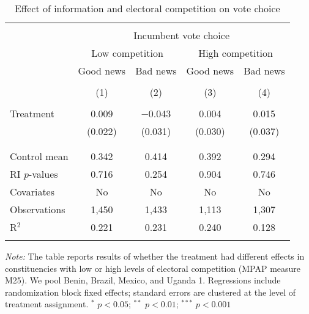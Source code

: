 
\begin{table}[!htbp] \centering 
  \caption{Effect of information and electoral competition on vote choice} 
  \label{competition} 
\begin{tabular}{@{\extracolsep{1pt}}lcccc} 
\\[-1.8ex]\hline 
\hline \\[-1.8ex] 
 & \multicolumn{4}{c}{Incumbent vote choice} \\ 
\cline{2-5} 
& \multicolumn{2}{c}{Low competition} &\multicolumn{2}{c}{High competition} \\
\cline{2-5}
 & Good news & Bad news & Good news & Bad news \\ 
\\[-1.8ex] & (1) & (2) & (3) & (4)\\ 
\hline \\[-1.8ex] 
 Treatment & 0.009 & $-$0.043 & 0.004 & 0.015 \\ 
  & (0.022) & (0.031) & (0.030) & (0.037) \\ 
  & & & & \\ 
\hline \\[-1.8ex] 
Control mean & 0.342 & 0.414 & 0.392 & 0.294 \\ 
RI $p$-values & 0.716 & 0.254 & 0.904 & 0.746 \\ 
Covariates & No & No & No & No \\ 
Observations & 1,450 & 1,433 & 1,113 & 1,307 \\ 
R$^{2}$ & 0.221 & 0.231 & 0.240 & 0.128 \\ 
\hline 
\hline \\[-1.8ex] 
\end{tabular} 
\begin{flushleft}\textit{Note:} The table reports results of whether the treatment had different effects in constituencies with low or high levels of electoral competition (MPAP measure M25). We pool Benin, Brazil, Mexico, and Uganda 1. Regressions include randomization block fixed effects; standard errors are clustered at the level of treatment assignment. $^*$ $p<0.05$; $^{**}$ $p<0.01$; $^{***}$ $p<0.001$ \end{flushleft}
\end{table} 
